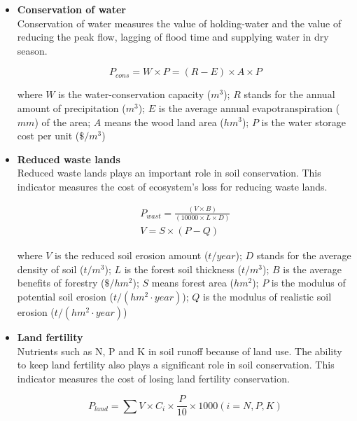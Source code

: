 \documentclass{mcmthesis}
\begin{document}
				\begin{itemize}
					
					\item \textbf{Conservation of water} \\
					Conservation of water measures the value of holding-water and the value of reducing the peak flow, lagging of flood time and supplying water in dry season.
					
					\begin{equation}
						P_{cons} = W \times P = ( R - E ) \times A \times P
					\end{equation}
					
					where $W$ is the water-conservation capacity ($m^3$); $R$ stands for the annual amount of precipitation ($m^3$); $E$ is the average annual evapotranspiration ($mm$) of the area; $A$ means the wood land area ($hm^3$); $P$ is the water storage cost per unit ($\$/m^3$)
					
					\item \textbf{Reduced waste lands} \\
					Reduced waste lands plays an important role in soil conservation. This indicator measures the cost of ecosystem’s loss for reducing waste lands.
					
					\begin{equation}
					\begin{array} { l } 
					{ P _ { wast } = \frac { ( V \times B ) } { ( 10000 \times L \times D ) } } \\ 
					{ V = S \times ( P - Q ) } 
					\end{array}
					\end{equation}
					
					where $V$ is the reduced soil erosion amount ($t/year$); $D$ stands for the average density of soil ($t/m^3$); $L$ is the forest soil thickness ($t/m^3$); $B$ is the average benefits of forestry ($\$/hm^2$); $S$ means forest area ($hm^2$); $P$ is the modulus of potential soil erosion ($t/(hm^2 ·year)$); $Q$ is the modulus of realistic soil erosion ($t/(hm^2 ·year)$)
					
					\item \textbf{Land fertility}\\
					Nutrients such as N, P and K in soil runoff because of land use. The ability to keep land fertility also plays a significant role in soil conservation. This indicator measures the cost of losing land fertility conservation.
					
					\begin{equation}
					P _ { land } = \sum V \times C _ { i } \times \frac { P } { 10 } \times 1000 ( i = N , P , K )
					\end{equation}
					

\end{itemize}
\end{document}
